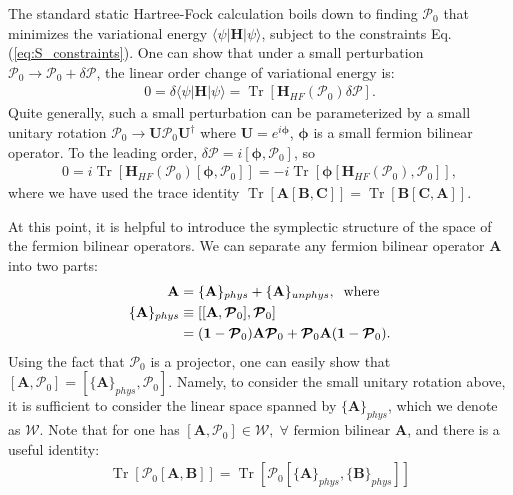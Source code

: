 \begin{subappendices}
The standard static Hartree-Fock calculation boils down to finding $\boldsymbol{\mathcal P}_0$ that minimizes the variational energy $\langle\psi|\mathbf H|\psi\rangle$, subject to the constraints Eq.(\ref{eq:S_constraints}). One can show that under a small perturbation $\boldsymbol{\mathcal P}_0\rightarrow \boldsymbol{\mathcal P}_0+\delta\boldsymbol{\mathcal P}$, the linear order change of variational energy is:
\begin{align}
0=\delta\langle\psi|\mathbf H|\psi\rangle=\mathop{\mathrm{Tr}}[\mathbf H_{HF}(\boldsymbol{\mathcal P}_0)\delta\boldsymbol{\mathcal P}].
\end{align}
Quite generally, such a small perturbation can be parameterized by a small unitary rotation $\boldsymbol{\mathcal P}_0\rightarrow \mathbf U\boldsymbol{\mathcal P}_0\mathbf U^\dagger$ where $\mathbf U=e^{i\boldsymbol\phi}$, $\boldsymbol\phi$ is a small fermion bilinear operator. To the leading order, $\delta\boldsymbol{\mathcal P}=i[\boldsymbol\phi,\boldsymbol{\mathcal P}_0]$, so
\begin{align}
0=i\mathop{\mathrm{Tr}}[\mathbf H_{HF}(\boldsymbol{\mathcal P}_0)[\boldsymbol\phi,\boldsymbol{\mathcal P}_0]]=-i\mathop{\mathrm{Tr}}[\boldsymbol\phi[\mathbf H_{HF}(\boldsymbol{\mathcal P}_0),\boldsymbol{\mathcal P}_0]],\label{eq:P0_condition}
\end{align}
where we have used the trace identity $\mathop{\mathrm{Tr}}[\mathbf A[\mathbf B,\mathbf C]]=\mathop{\mathrm{Tr}}[\mathbf B[\mathbf C,\mathbf A]]$.

At this point, it is helpful to introduce the symplectic structure of the space of the fermion bilinear operators. We can separate any fermion bilinear operator $\mathbf A$ into two parts:
\begin{align}
\mathbf A&=\{\mathbf A\}_{phys}+\{\mathbf A\}_{unphys},\;\;\text{where}\notag\\
\{\mathbf A\}_{phys}&\equiv [[\mathbf A,\boldsymbol{\mathcal P}_0],\boldsymbol{\mathcal P}_0]\notag\\
&=(\mathbf 1-\boldsymbol{\mathcal P}_0)\mathbf A\boldsymbol{\mathcal P}_0+\boldsymbol{\mathcal P}_0\mathbf A(\mathbf 1-\boldsymbol{\mathcal P}_0).
\end{align}
Using the fact that $\boldsymbol{\mathcal P}_0$ is a projector, one can easily show that $[\mathbf A,\boldsymbol{\mathcal P}_0]=[\{\mathbf A\}_{phys},\boldsymbol{\mathcal P}_0]$. Namely, to consider the small unitary rotation above, it is sufficient to consider the linear space spanned by $\{\mathbf A\}_{phys}$, which we denote as $\boldsymbol{\mathcal W}$. Note that for one has $[\mathbf A,\boldsymbol{\mathcal P}_0]\in \boldsymbol{\mathcal W},\; \forall \text{ fermion bilinear } \mathbf A$, and there is a useful identity:
\begin{align}
\mathop{\mathrm{Tr}}[\boldsymbol{\mathcal P}_0[\mathbf A,\mathbf B]]=\mathop{\mathrm{Tr}}[\boldsymbol{\mathcal P}_0[\{\mathbf A\}_{phys},\{\mathbf B\}_{phys}]]
\end{align}


\end{subappendices}
